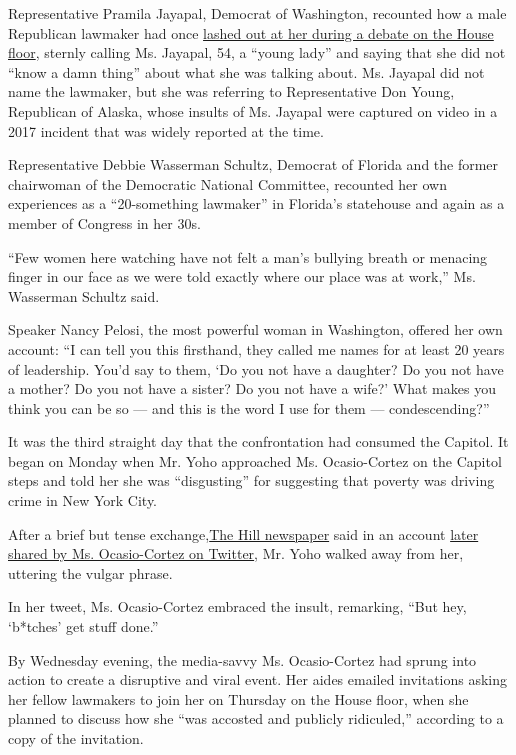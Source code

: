 Representative Pramila Jayapal, Democrat of Washington, recounted how a
male Republican lawmaker had once
\href{https://www.facebookcorewwwi.onion/seattletimes/videos/rep-pramila-jayapal-called-a-young-lady-by-alaska-congressman/10155535644411215/}{lashed
out at her during a debate on the House floor}, sternly calling Ms.
Jayapal, 54, a ``young lady'' and saying that she did not ``know a damn
thing'' about what she was talking about. Ms. Jayapal did not name the
lawmaker, but she was referring to Representative Don Young, Republican
of Alaska, whose insults of Ms. Jayapal were captured on video in a 2017
incident that was widely reported at the time.

Representative Debbie Wasserman Schultz, Democrat of Florida and the
former chairwoman of the Democratic National Committee, recounted her
own experiences as a ``20-something lawmaker'' in Florida's statehouse
and again as a member of Congress in her 30s.

``Few women here watching have not felt a man's bullying breath or
menacing finger in our face as we were told exactly where our place was
at work,'' Ms. Wasserman Schultz said.

Speaker Nancy Pelosi, the most powerful woman in Washington, offered her
own account: ``I can tell you this firsthand, they called me names for
at least 20 years of leadership. You'd say to them, `Do you not have a
daughter? Do you not have a mother? Do you not have a sister? Do you not
have a wife?' What makes you think you can be so --- and this is the
word I use for them --- condescending?''

It was the third straight day that the confrontation had consumed the
Capitol. It began on Monday when Mr. Yoho approached Ms. Ocasio-Cortez
on the Capitol steps and told her she was ``disgusting'' for suggesting
that poverty was driving crime in New York City.

After a brief but tense
exchange,\href{https://thehill.com/homenews/house/508259-ocaasio-cortez-accosted-by-gop-lawmaker-over-remarks-that-kind-of}{The
Hill newspaper} said in an account
\href{https://twitter.com/AOC/status/1285574615910227968?s=20}{later
shared by Ms. Ocasio-Cortez on Twitter}, Mr. Yoho walked away from her,
uttering the vulgar phrase.

In her tweet, Ms. Ocasio-Cortez embraced the insult, remarking, ``But
hey, `b*tches' get stuff done.''

By Wednesday evening, the media-savvy Ms. Ocasio-Cortez had sprung into
action to create a disruptive and viral event. Her aides emailed
invitations asking her fellow lawmakers to join her on Thursday on the
House floor, when she planned to discuss how she ``was accosted and
publicly ridiculed,'' according to a copy of the invitation.

